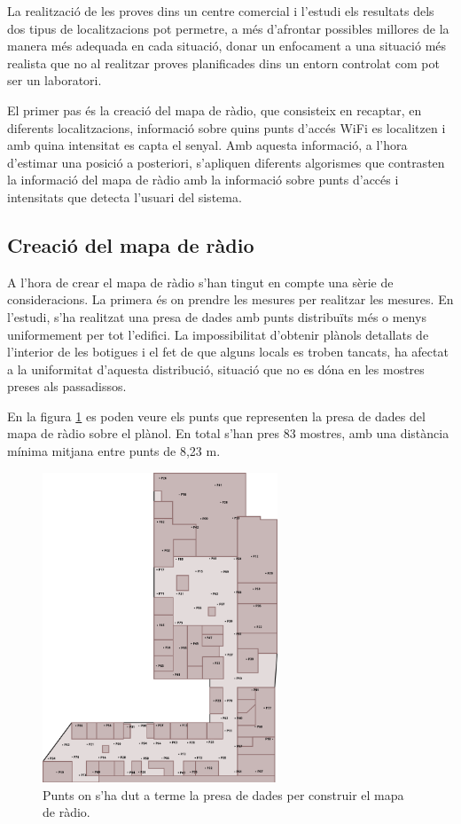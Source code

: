 La realització de les proves dins un centre comercial i l'estudi els resultats dels dos tipus de localitzacions pot permetre, a més d'afrontar possibles millores de la manera més adequada en cada situació, donar un enfocament a una situació més realista que no al realitzar proves planificades dins un entorn controlat com pot ser un laboratori.

El primer pas és la creació del mapa de ràdio, que consisteix en recaptar, en diferents localitzacions, informació sobre quins punts d'accés WiFi es localitzen i amb quina intensitat es capta el senyal. Amb aquesta informació, a l'hora d'estimar una posició a posteriori, s'apliquen diferents algorismes que contrasten la informació del mapa de ràdio amb la informació sobre punts d'accés i intensitats que detecta l'usuari del sistema.

\subsection{Creació del mapa de ràdio}

A l'hora de crear el mapa de ràdio s'han tingut en compte una sèrie de consideracions. La primera és on prendre les mesures per realitzar les mesures. En l'estudi, s'ha realitzat una presa de dades amb punts distribuïts més o menys uniformement per tot l'edifici. La impossibilitat d'obtenir plànols detallats de l'interior de les botigues i el fet de que alguns locals es troben tancats, ha afectat a la uniformitat d'aquesta distribució, situació que no es dóna en les mostres preses als passadissos.

En la figura \ref{fig:planol_log} es poden veure els punts que representen la presa de dades del mapa de ràdio sobre el plànol. En total s'han pres 83 mostres, amb una distància mínima mitjana entre punts de 8,23 m.

\begin{figure}[ht]
\begin{center}
\includegraphics[width=7cm]{imatges/planol_log.png}
\caption{Punts on s'ha dut a terme la presa de dades per construir el mapa de ràdio.}
\label{fig:planol_log}
\end{center}
\end{figure}

